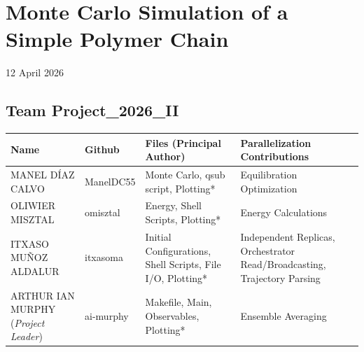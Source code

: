 \documentclass[
]{article}
\author{}
\date{}
\newcounter{none} %
\begin{document}
\section{\texorpdfstring{\textbf{Monte Carlo Simulation of a Simple
Polymer
Chain}}{Monte Carlo Simulation of a Simple Polymer Chain}}\label{monte-carlo-simulation-of-a-simple-polymer-chain}

12 April 2026

\subsection{\texorpdfstring{Team
\textbf{Project\_2026\_II}}{Team Project\_2026\_II}}\label{team-project_2026_ii}

{\def\LTcaptype{none} %
\begin{longtable}[]{@{}
  >{\raggedright\arraybackslash}p{}
  >{\raggedright\arraybackslash}p{}
  >{\raggedright\arraybackslash}p{}
  >{\raggedright\arraybackslash}p{}@{}}
\toprule\noalign{}
\begin{minipage}[b]{\linewidth}\raggedright
Name
\end{minipage} & \begin{minipage}[b]{\linewidth}\raggedright
Github
\end{minipage} & \begin{minipage}[b]{\linewidth}\raggedright
Files (Principal Author)
\end{minipage} & \begin{minipage}[b]{\linewidth}\raggedright
Parallelization Contributions
\end{minipage} \\
\midrule\noalign{}
\endhead
\bottomrule\noalign{}
\endlastfoot
MANEL DÍAZ CALVO & ManelDC55 & Monte Carlo, qsub script, Plotting* &
Equilibration Optimization \\
OLIWIER MISZTAL & omisztal & Energy, Shell Scripts, Plotting* & Energy
Calculations \\
ITXASO MUÑOZ ALDALUR & itxasoma & Initial Configurations, Shell Scripts,
File I/O, Plotting* & Independent Replicas, Orchestrator
Read/Broadcasting, Trajectory Parsing \\
ARTHUR IAN MURPHY (\emph{Project Leader}) & ai-murphy & Makefile, Main,
Observables, Plotting* & Ensemble Averaging \\
\end{longtable}
}
\end{document}
